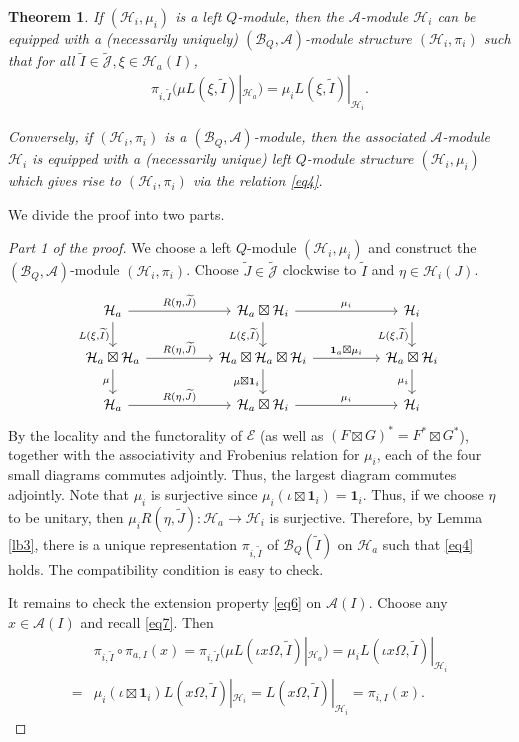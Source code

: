 \documentclass[11pt,b5paper,notitlepage]{article}
\theoremstyle{definition}
\theoremstyle{plain}
\newtheorem{thm}[df]{Theorem}
\newcommand{\mc}{\mathcal}
\newcommand{\wtd}{\widetilde}
\newcommand{\id}{\mathbf{1}}
\newcommand{\scr}{\mathscr}
\newcommand{\Jtd}{\widetilde{\mathcal J}}
\numberwithin{equation}{section}
\begin{document}
\begin{thm}\label{lb6}
If $(\mc H_i,\mu_i)$ is a left $Q$-module, then the $\mc A$-module $\mc H_i$ can be equipped with a  (necessarily uniquely) $(\mc B_Q,\mc A)$-module structure $(\mc H_i,\pi_i)$ such that for all $\wtd I\in\Jtd,\xi\in\mc H_a(I)$,
\begin{align}\label{eq4}
\pi_{i,\wtd I}\big(\mu L(\xi,\wtd I)|_{\mc H_a}\big)=\mu_i L(\xi,\wtd I)|_{\mc H_i}.
\end{align}


Conversely, if $(\mc H_i,\pi_i)$ is a $(\mc B_Q,\mc A)$-module, then the associated $\mc A$-module $\mc H_i$ is equipped with a (necessarily unique) left $Q$-module structure $(\mc H_i,\mu_i)$ which gives rise to $(\mc H_i,\pi_i)$ via the relation \eqref{eq4}.
\end{thm}

We divide the proof into two parts.

\begin{proof}[Part 1 of the proof]
We choose a left $Q$-module $(\mc H_i,\mu_i)$ and construct the $(\mc B_Q,\mc A)$-module $(\mc H_i,\pi_i)$. Choose $\wtd J\in\Jtd$ clockwise to $\wtd I$ and $\eta\in\mc H_i(J)$.
\begin{equation}\label{eq27}
\begin{tikzcd}
\mc H_a\arrow[rr,"{R(\eta,\wtd J)}"]\arrow[d,"{L(\xi,\wtd I)}"'] &&\mc H_a\boxtimes\mc H_i\arrow[rr,"\mu_i"]\arrow[d,"{L(\xi,\wtd I)}"']&&\mc H_i\arrow[d,"{L(\xi,\wtd I)}"']\\
\mc H_a\boxtimes\mc H_a\arrow[rr,"{R(\eta,\wtd J)}"]\arrow[d,"\mu"']&&\mc H_a\boxtimes\mc H_a\boxtimes\mc H_i\arrow[rr,"\id_a\boxtimes\mu_i"]\arrow[d,"\mu\boxtimes\id_i"']&&\mc H_a\boxtimes\mc H_i\arrow[d,"\mu_i"']\\
\mc H_a\arrow[rr,"{R(\eta,\wtd J)}"]&&\mc H_a\boxtimes\mc H_i\arrow[rr,"\mu_i"]&&\mc H_i
\end{tikzcd}
\end{equation}
By the locality and the functorality of $\scr E$ (as well as $(F\boxtimes G)^*=F^*\boxtimes G^*$), together with the associativity and Frobenius relation for $\mu_i$, each of the four small diagrams commutes adjointly. Thus, the largest diagram commutes adjointly. Note that $\mu_i$ is surjective since $\mu_i(\iota\boxtimes\id_i)=\id_i$. Thus, if we choose $\eta$ to be unitary, then $\mu_i R(\eta,\wtd J):\mc H_a\rightarrow\mc H_i$ is surjective. Therefore, by Lemma \ref{lb3}, there is a unique representation $\pi_{i,\wtd I}$ of $\mc B_Q(\wtd I)$ on $\mc H_a$ such that \eqref{eq4} holds. The compatibility condition is easy to check.

It remains to check the extension property \eqref{eq6} on $\mc A(I)$. Choose any $x\in\mc A(I)$ and recall \eqref{eq7}. Then
\begin{align}
&\pi_{i,\wtd I}\circ\pi_{a,I}(x)=\pi_{i,\wtd I}(\mu L(\iota x\Omega,\wtd I)|_{\mc H_a})=\mu_i L(\iota x\Omega,\wtd I)|_{\mc H_i}\nonumber\\
=&\mu_i(\iota\boxtimes \id_i) L(x\Omega,\wtd I)|_{\mc H_i}=L(x\Omega,\wtd I)|_{\mc H_i}=\pi_{i,I}(x).\label{eq12}
\end{align}
\end{proof}
\end{document}
